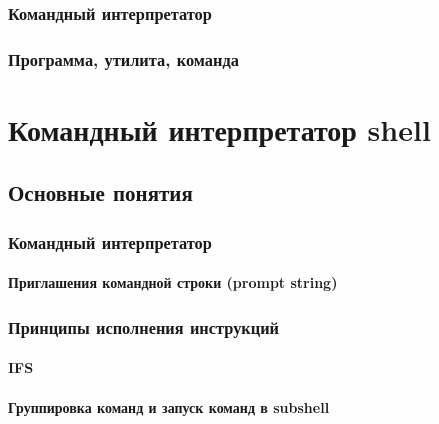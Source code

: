 \documentclass[oneside]{book}
\begin{document}
		\section{Командный интерпретатор}
		
		
		\section{Программа, утилита, команда}
		



\part{Командный интерпретатор shell}
%

	\chapter{Основные понятия}
	
		
		\section{Командный интерпретатор}
		
		
			\subsection{Приглашения командной строки (prompt string)}
						
					
		\section{Принципы исполнения инструкций}
		
			\subsection{IFS}
			
			
			\subsection{Группировка команд и запуск команд в subshell}
			
			
\end{document}
